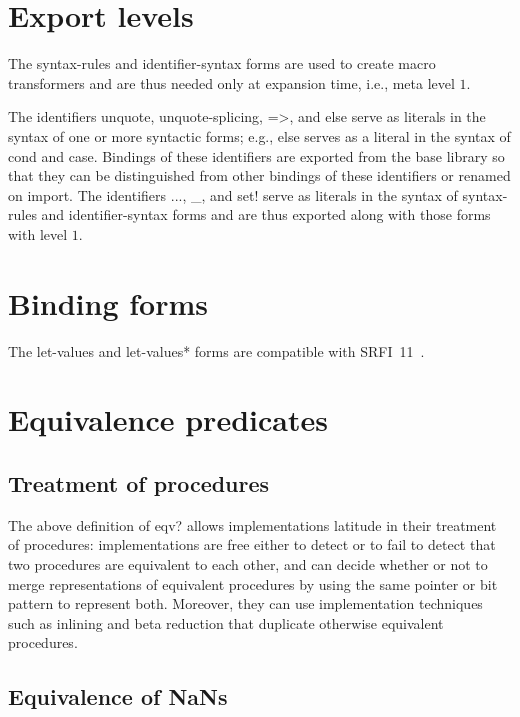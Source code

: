 \documentclass[twoside,twocolumn]{algol60}
\begin{document}
\section{Export levels}

The {\cf syntax-rules} and {\cf identifier-syntax} forms are
used to create macro transformers and are thus needed only at
expansion time, i.e., meta level $1$.  

The identifiers {\cf unquote}, {\cf unquote-splicing}, {\cf =>}, and
{\cf else} serve as literals in the syntax of one or more
syntactic forms; e.g., {\cf else} serves as a
literal in the syntax of {\cf cond} and {\cf case}.
Bindings of these identifiers are exported from the base library so
that they can be distinguished from other bindings of these identifiers
or renamed on import.
The identifiers {\cf ...}, {\cf \_}, and {\cf set!} serve as
literals in the syntax of {\cf syntax-rules} and
{\cf identifier-syntax} forms and are thus exported along with those
forms with level $1$.

\section{Binding forms}

The {\cf let-values} and {\cf let-values*} forms are compatible with
SRFI~11~\cite{srfi11}.

\section{Equivalence predicates}

\subsection{Treatment of procedures}

The above definition of {\cf eqv?} allows implementations latitude in
their treatment of procedures: implementations are free either to
detect or to fail to detect that two procedures are equivalent to each
other, and can decide whether or not to merge representations of
equivalent procedures by using the same pointer or bit pattern to
represent both.  Moreover, they can use implementation techniques such
as inlining and beta reduction that duplicate otherwise equivalent
procedures.

\subsection{Equivalence of NaNs}
\end{document}

